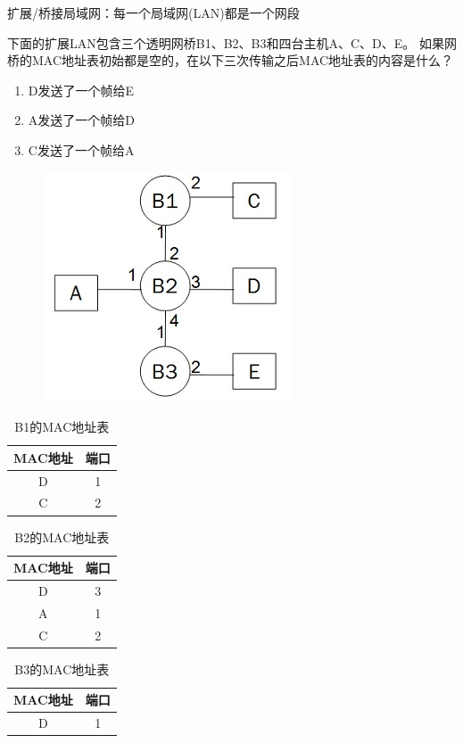 扩展/桥接局域网：每一个局域网(LAN)都是一个网段
\begin{example}
	下面的扩展LAN包含三个透明网桥B1、B2、B3和四台主机A、C、D、E。
	如果网桥的MAC地址表初始都是空的，在以下三次传输之后MAC地址表的内容是什么？
	\begin{enumerate}
	\item D发送了一个帧给E
	\item A发送了一个帧给D
	\item C发送了一个帧给A
	\end{enumerate}
	\begin{figure}[H]
		\centering
		\includegraphics[width=0.3\linewidth]{fig/mac_address.jpg}
	\end{figure}
\end{example}
\begin{analysis}
	\begin{minipage}{0.32\linewidth}
	\begin{table}[H]
		\centering
		\caption*{B1的MAC地址表}
		\begin{tabular}{|c|c|}\hline
			MAC地址 & 端口 \\\hline
			D & 1\\\hline
			C & 2\\\hline
		\end{tabular}
	\end{table}
	\end{minipage}
	\begin{minipage}{0.32\linewidth}
	\begin{table}[H]
		\centering
		\caption*{B2的MAC地址表}
		\begin{tabular}{|c|c|}\hline
			MAC地址 & 端口 \\\hline
			D & 3\\\hline
			A & 1\\\hline
			C & 2\\\hline
		\end{tabular}
	\end{table}
	\end{minipage}
	\begin{minipage}{0.32\linewidth}
	\begin{table}[H]
		\centering
		\caption*{B3的MAC地址表}
		\begin{tabular}{|c|c|}\hline
			MAC地址 & 端口 \\\hline
			D & 1\\\hline
		\end{tabular}
	\end{table}
	\end{minipage}
\end{analysis}

